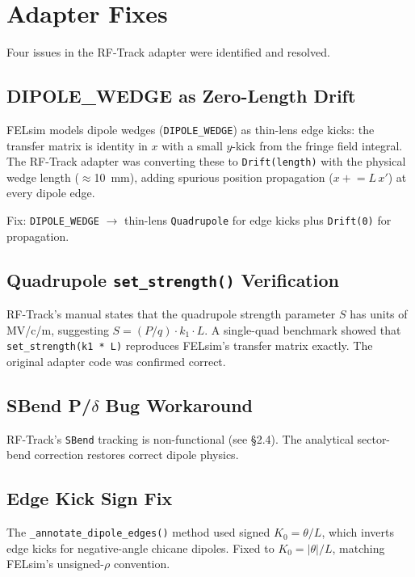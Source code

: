 \documentclass[11pt]{article}
\begin{document}
\section{Adapter Fixes}

Four issues in the RF-Track adapter were identified and resolved.

\subsection{DIPOLE\_WEDGE as Zero-Length Drift}

FELsim models dipole wedges (\texttt{DIPOLE\_WEDGE}) as thin-lens edge kicks:
the transfer matrix is identity in $x$ with a small $y$-kick from the
fringe field integral.  The RF-Track adapter was converting these to
\texttt{Drift(length)} with the physical wedge length ($\approx$\SI{10}{mm}),
adding spurious position propagation ($x \mathrel{+}= L\,x'$) at every
dipole edge.

Fix: \texttt{DIPOLE\_WEDGE} $\to$ thin-lens \texttt{Quadrupole} for edge kicks
plus \texttt{Drift(0)} for propagation.

\subsection{Quadrupole \texttt{set\_strength()} Verification}

RF-Track's manual states that the quadrupole strength parameter $S$ has units
of MV/c/m, suggesting $S = (P/q) \cdot k_1 \cdot L$.  A single-quad
benchmark showed that \texttt{set\_strength(k1 * L)} reproduces FELsim's
transfer matrix exactly.  The original adapter code was confirmed correct.

\subsection{SBend P/$\delta$ Bug Workaround}

RF-Track's \texttt{SBend} tracking is non-functional (see \S2.4).
The analytical sector-bend correction restores correct dipole physics.

\subsection{Edge Kick Sign Fix}

The \texttt{\_annotate\_dipole\_edges()} method used signed $K_0 = \theta/L$,
which inverts edge kicks for negative-angle chicane dipoles.  Fixed to
$K_0 = |\theta|/L$, matching FELsim's unsigned-$\rho$ convention.
\end{document}
